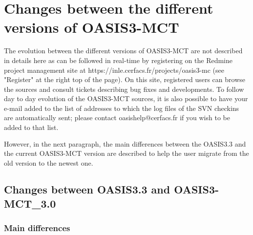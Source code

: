 \newpage

\chapter{Changes between the different versions of OASIS3-MCT}
\label{sec_changes}

The evolution between the different versions of OASIS3-MCT are not
described in details here as can be
followed in real-time by registering on the Redmine project management
site at https://inle.cerfacs.fr/projects/oasis3-mc (see "Register" at the right top of
the page). On this site, registered users can browse the sources and
consult tickets describing bug fixes and developments. To follow day
to day evolution of the OASIS3-MCT sources, it is also possible to
have your e-mail added to the list of addresses to which the log files
of the SVN checkins are automatically sent; please contact
oasishelp@cerfacs.fr if you wish to be added to that list.

However, in the next paragraph, the main differences between the
OASIS3.3 and the current OASIS3-MCT version are described to help the
user migrate from the old version to the newest one.

\section{Changes between OASIS3.3 and OASIS3-MCT\_3.0}
\label{sec_oa2_oa3}

\subsection {Main differences}

